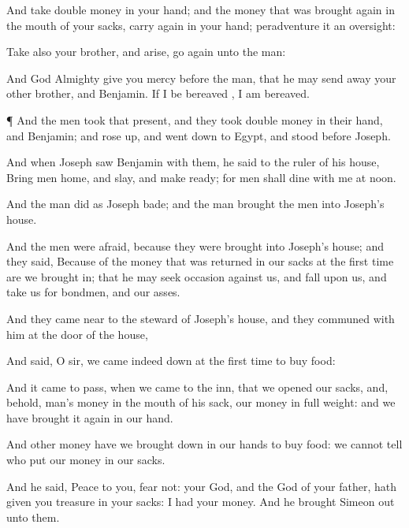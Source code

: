 {And
take
double
money in your
hand; and the
money that was brought
again in the
mouth of your
sacks, carry
{}
again in your
hand; peradventure it
{} an
oversight:

Take also your
brother, and
arise, go
again unto the
man:

And
God
Almighty
give you
mercy
before the
man, that he may send
away your
other
brother, and
Benjamin.
If I be
bereaved
{}, I am
bereaved.


\par }{\PP {}¶ And the
men
took
that
present, and they
took
double
money in their
hand, and
Benjamin; and rose
up, and went
down to
Egypt, and
stood
before
Joseph.

And when
Joseph
saw
Benjamin
with them, he
said to the ruler of his
house,
Bring
{}
men
home, and
slay, and make
ready; for
{}
men shall
dine with me at
noon.

And the
man
did as
Joseph
bade; and the
man
brought the
men into
Joseph’s
house.

And the
men were
afraid, because they were
brought into
Joseph’s
house; and they
said,
Because of the
money that was
returned in our
sacks at the first
time are we brought
in; that he may seek
occasion against us, and
fall upon us, and
take us for
bondmen, and our
asses.

And they came
near to the
steward of
Joseph’s
house, and they
communed with him at the
door of the
house,

And
said,
O
sir, we came
indeed
down at the first
time to
buy
food:

And it came to pass, when we
came to the
inn, that we
opened our
sacks, and, behold,
{}
man’s
money
{} in the
mouth of his
sack, our
money in full
weight: and we have brought it
again in our
hand.

And
other
money have we brought
down in our
hands to
buy
food: we cannot
tell who
put our
money in our
sacks.

And he
said,
Peace
{} to you,
fear not: your
God, and the
God of your
father, hath
given you
treasure in your
sacks: I
had your
money. And he
brought
Simeon out unto them.

}
